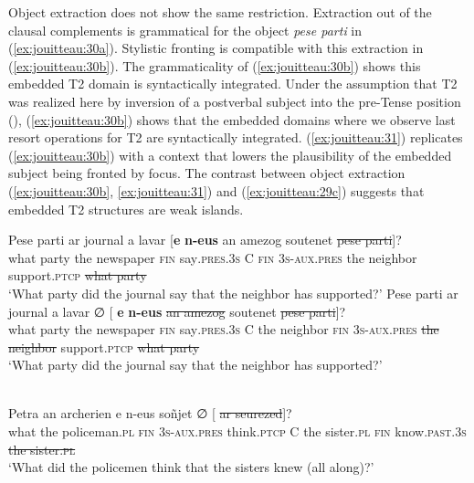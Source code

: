 \documentclass[output=paper,colorlinks,citecolor=brown]{langscibook}
\begin{document}
                
Object extraction does not show the same restriction. Extraction out of the clausal complements is grammatical for the object \textit{pese parti} in (\ref{ex:jouitteau:30a}). Stylistic fronting is compatible with this extraction in (\ref{ex:jouitteau:30b}). The grammaticality of (\ref{ex:jouitteau:30b}) shows this embedded T2 domain is syntactically integrated. Under the assumption that T2 was realized here by inversion of a postverbal subject into the pre-Tense position (), (\ref{ex:jouitteau:30b}) shows that the embedded domains where we observe last resort operations for T2 are syntactically integrated. (\ref{ex:jouitteau:31}) replicates (\ref{ex:jouitteau:30b}) with a context that lowers the plausibility of the embedded subject being fronted by focus. The contrast between object extraction (\ref{ex:jouitteau:30b}, \ref{ex:jouitteau:31}) and (\ref{ex:jouitteau:29c}) suggests that embedded T2 structures are weak islands. 


\ea \label{ex:jouitteau:30}
\ea \label{ex:jouitteau:30a}
    \gll Pese parti   ar  journal      a    lavar            \FirstPosition{\BoldNull}  [\textbf{e}  \textbf{n-eus}  an amezog      soutenet \sout{pese parti}]? \\
    what party the newspaper \textsc{fin} say\textsc{.pres.3s} C    \textsc{fin} \textsc{3s-aux.pres}   the neighbor support\textsc{.ptcp} \sout{what party}    \\
    \glt   ‘What party did the journal say that the neighbor has supported?’
    \ex \label{ex:jouitteau:30b}
    \gll Pese parti   ar  journal       a    lavar ∅   [       \textbf{e}  \textbf{n-eus}    \sout{an amezog}                soutenet \sout{pese parti}]? \\
    what party the newspaper \textsc{fin} say\textsc{.pres.3s}    C     {the neighbor} \textsc{fin} \textsc{3s-aux.pres} \sout{the neighbor} support\textsc{.ptcp} \sout{what party}\\
    \glt ‘What party did the journal say that the neighbor has supported?’
    \z 
    \z 

    
\ea \label{ex:jouitteau:31} \\
    \gll Petra  an archerien    e   n-eus soñjet   ∅  [ {}   {}   \sout{ar  seurezed}]?  \\
    what  the policeman\textsc{.pl} \textsc{fin} \textsc{3s-aux.pres}  think\textsc{.ptcp} C     {the sister\textsc{.pl}}     \textsc{fin} know\textsc{.past.3s}  \sout{the sister\textsc{.pl}}\\
    \glt ‘What did the policemen think that the sisters knew (all along)?’
    \z 
\end{document}
